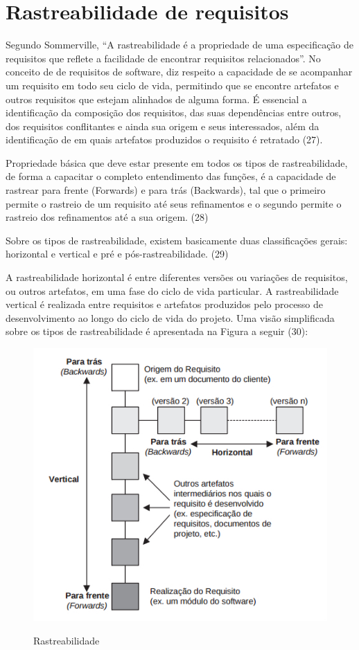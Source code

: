 \section{Rastreabilidade de requisitos}

Segundo Sommerville, “A rastreabilidade é a propriedade de uma especificação de requisitos que reflete a facilidade de encontrar requisitos relacionados”. No conceito de de requisitos de software, diz respeito a capacidade de se acompanhar um requisito em todo seu ciclo de vida, permitindo que se encontre artefatos e outros requisitos que estejam alinhados de alguma forma. É essencial a identificação da composição dos requisitos, das suas dependências entre outros, dos requisitos conflitantes e ainda sua origem e seus interessados, além da identificação de em quais artefatos produzidos o requisito é retratado (27).

Propriedade básica que deve estar presente em todos os tipos de rastreabilidade, de forma a capacitar o completo entendimento das funções, é a capacidade de rastrear para frente (Forwards) e para trás (Backwards), tal que o primeiro permite o rastreio de um requisito até seus refinamentos e  o segundo permite o rastreio dos refinamentos até a sua origem. (28)

Sobre os tipos de rastreabilidade, existem basicamente duas classificações gerais: horizontal e vertical e pré e pós-rastreabilidade. (29)

A rastreabilidade horizontal é entre diferentes versões ou variações de requisitos, ou outros artefatos, em uma fase do ciclo de vida particular. A rastreabilidade vertical é realizada entre requisitos e artefatos produzidos pelo processo de desenvolvimento ao longo do ciclo de vida do projeto.
Uma visão simplificada sobre os tipos de rastreabilidade é apresentada na Figura a seguir (30):

\FloatBarrier
\begin{figure}[!htpd]
		\centering
		\includegraphics[scale=0.8]{figuras/Rastreabilidade}
		\label{img:SAF}
		\caption{Rastreabilidade}
\end{figure}
\FloatBarrier

